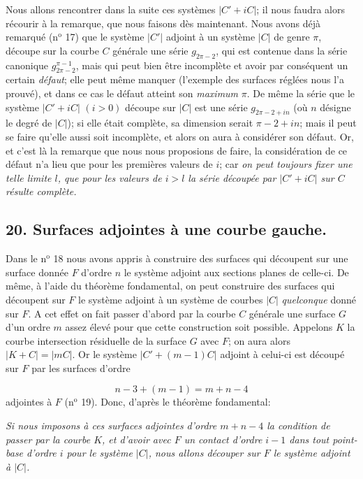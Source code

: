 \documentclass{article}
\begin{document}
Nous allons rencontrer dans la suite ces systèmes $|C'+iC|$; il nous faudra alors récourir à la remarque, que nous faisons dès maintenant. Nous avons déjà remarqué (n${}^{\text{o}}$ 17) que le système $|C'|$ adjoint à un système $|C|$ de genre $\pi$, découpe sur la courbe $C$ générale une série $g_{2\pi-2}$, qui est contenue dans la série canonique $g_{2\pi-2}^{\pi-1}$, mais qui peut bien être incomplète et avoir par conséquent un certain \emph{défaut}; elle peut même manquer (l'exemple des surfaces réglées nous l'a prouvé), et dans ce cas le défaut atteint son \emph{maximum} $\pi$. De même la série que le système $|C'+iC|$ $(i > 0)$ découpe sur $|C|$ est une série $g_{2\pi-2+in}$ (où $n$ désigne le degré de $|C|$); si elle était complète, sa dimension serait $\pi-2+in$; mais il peut se faire qu'elle aussi soit incomplète, et alors on aura à considérer son défaut. Or, et c'est là la remarque que nous nous proposions de faire, la considération de ce défaut n'a lieu que pour les premières valeurs de $i$; car \emph{on peut toujours fixer une telle limite $l$, que pour les valeurs de $i > l$ la série découpée par $|C'+iC|$ sur $C$ résulte complète.}

\subsection*{20. Surfaces adjointes à une courbe gauche.}

Dans le n${}^{\text{o}}$ 18 nous avons appris à construire des surfaces qui découpent sur une surface donnée $F$ d'ordre $n$ le système adjoint aux sections planes de celle-ci. De même, à l'aide du théorème fondamental, on peut construire des surfaces qui découpent sur $F$ le système adjoint à un système de courbes $|C|$ \emph{quelconque} donné sur $F$. A cet effet on fait passer d'abord par la courbe $C$ générale une surface $G$ d'un ordre $m$ assez élevé pour que cette construction soit possible. Appelons $K$ la courbe intersection résiduelle de la surface $G$ avec $F$; on aura alors $|K+C| = |mC|$. Or le système $|C'+(m-1)C|$ adjoint à celui-ci est découpé sur $F$ par les surfaces d'ordre

\[ n-3+(m-1) = m+n-4 \]
adjointes à $F$ (n${}^{\text{o}}$ 19). Donc, d'après le théorème fondamental:

\emph{Si nous imposons à ces surfaces adjointes d'ordre $m+n-4$ la condition de passer par la courbe $K$, et d'avoir avec $F$ un contact d'ordre $i-1$ dans tout point-base d'ordre $i$ pour le système $|C|$, nous allons découper sur $F$ le système adjoint à $|C|$.}
\end{document}
